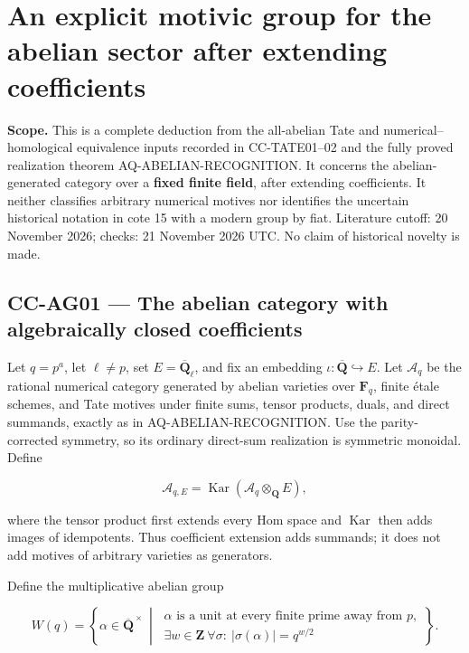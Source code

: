 \documentclass[11pt,a4paper]{article}
\theoremstyle{definition}\newtheorem{definition}[theorem]{Definition}
\theoremstyle{remark}\newtheorem{remark}[theorem]{Remark}
\begin{document}

\section{An explicit motivic group for the abelian sector after
extending
coefficients}\label{an-explicit-motivic-group-for-the-abelian-sector-after-extending-coefficients}

\textbf{Scope.} This is a complete deduction from the all-abelian Tate
and numerical--homological equivalence inputs recorded in CC-TATE01--02
and the fully proved realization theorem AQ-ABELIAN-RECOGNITION. It
concerns the abelian-generated category over a \textbf{fixed finite
field}, after extending coefficients. It neither classifies arbitrary
numerical motives nor identifies the uncertain historical notation in
cote 15 with a modern group by fiat. Literature cutoff: 20 November
2026; checks: 21 November 2026 UTC. No claim of historical novelty is
made.

\subsection{CC-AG01 --- The abelian category with algebraically closed
coefficients}\label{cc-ag01-the-abelian-category-with-algebraically-closed-coefficients}

Let \(q=p^a\), let \(\ell\ne p\), set \(E=\overline{\mathbf Q}_\ell\),
and fix an embedding \(\iota:\overline{\mathbf Q}\hookrightarrow E\).
Let \(\mathcal A_q\) be the rational numerical category generated by
abelian varieties over \(\mathbf F_q\), finite étale schemes, and Tate
motives under finite sums, tensor products, duals, and direct summands,
exactly as in AQ-ABELIAN-RECOGNITION. Use the parity-corrected symmetry,
so its ordinary direct-sum realization is symmetric monoidal. Define

\[
 \mathcal A_{q,E}
 =\operatorname{Kar}(\mathcal A_q\otimes_{\mathbf Q}E),
\]

where the tensor product first extends every Hom space and
\(\operatorname{Kar}\) then adds images of idempotents. Thus coefficient
extension adds summands; it does not add motives of arbitrary varieties
as generators.

Define the multiplicative abelian group

\[
 W(q)=\left\{\alpha\in\overline{\mathbf Q}^{\,\times}\ \middle|\
 \begin{array}{l}
 \alpha\text{ is a unit at every finite prime away from }p,\\
 \exists w\in\mathbf Z\ \forall\sigma:\ |\sigma(\alpha)|=q^{w/2}
 \end{array}\right\}.
\]
\end{document}
